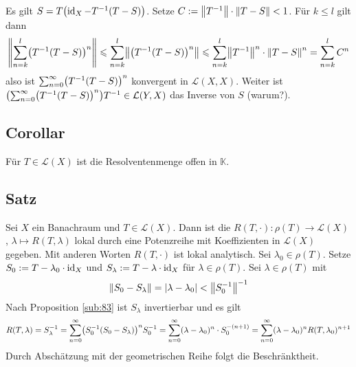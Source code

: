 Es gilt $S= T \enbrace[\big]{\id_X - T ^{-1}(T-S)}$. Setze $C := \norm{T ^{-1}} \cdot \norm{T-S} <1$.
Für $k \le l$ gilt dann 
\begin{align*}
	\norm{\sum_{n=k}^{l} \enbrace[\big]{T^{-1}(T-S)}^n } \le \sum_{n=k}^{l} \norm{\enbrace[\big]{T ^{-1}(T-S)}^n} \le \sum_{n=k}^{l} \norm{T ^{-1}}^n \cdot \norm{T-S}^n
	= \sum_{n=k}^{l} C^n      
\end{align*}
also ist $\sum_{n=0}^{\infty} \enbrace[\big]{T ^{-1}(T-S)}^n$ konvergent in $\mathcal{L}(X,X)$. Weiter ist 
$\enbrace*{\sum_{n=0}^{\infty} \enbrace[\big]{T ^{-1}(T-S)}^n} T ^{-1} \in \mathcal{L}(Y,X)$ das Inverse von $S$ (warum?). \bewende

\subsection[Corollar: Die Resolventenmenge von $T \in \mathcal{L}(X)$ ist offen in $\mathds{K}$]{Corollar} %
\label{sub:84}
Für $T \in \mathcal{L}(X)$ ist die Resolventenmenge offen in $\mathds{K}$.

\subsection[Satz: Die Resolventenabbildung ist lokal durch eine Potenzreihe gegeben]{Satz} %
\label{sub:85}
Sei $X$ ein Banachraum und $T \in \mathcal{L}(X)$. Dann ist die  $R(T,\cdot ) \colon \rho(T) \to \mathcal{L}(X)$, $\lambda \mapsto R(T,\lambda)$
lokal durch eine Potenzreihe mit Koeffizienten in $\mathcal{L}(X)$ gegeben. Mit anderen Worten $R(T,\cdot )$ ist lokal analytisch.
Sei $\lambda_0 \in \rho(T)$. Setze $S_0 := T- \lambda_0 \cdot \id_X$ und $S_\lambda := T- \lambda \cdot \id_X$ für $\lambda \in \rho(T)$. Sei $\lambda \in \rho(T)$ mit 
\[
	\norm{S_0 - S_\lambda} = \abs*{\lambda-\lambda_0}< \norm{S_0 ^{-1}} ^{-1}
\]
Nach Proposition \ref{sub:83} ist $S_\lambda$ invertierbar und es gilt 
\[
	R(T,\lambda) = S_\lambda ^{-1} = \sum_{n=0}^{\infty} \enbrace*{S_0^{-1} (S_0-S_\lambda)}^n S_0^{-1} = \sum_{n=0}^{\infty} (\lambda-\lambda_0)^n \cdot S_0^{-(n+1)}
	= \sum_{n=0}^{\infty} (\lambda-\lambda_0)^n R(T,\lambda_0)^{n+1}
\]
Durch Abschätzung mit der geometrischen Reihe folgt die Beschränktheit. \bewende

